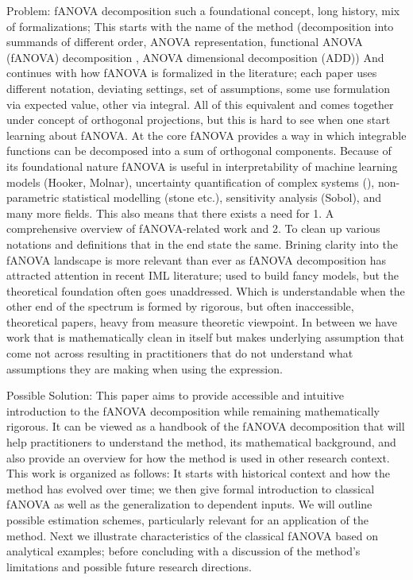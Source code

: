 
Problem: fANOVA decomposition such a foundational concept, long history, mix of formalizations;
This starts with the name of the method (decomposition into summands of different order, ANOVA representation, functional ANOVA (fANOVA) decomposition \cite{hooker2004}, ANOVA dimensional decomposition (ADD))
And continues with how fANOVA is formalized in the literature; each paper uses different notation, deviating settings, set of assumptions, some use formulation via expected value, other via integral.
All of this equivalent and comes together under concept of orthogonal projections, but this is hard to see when one start learning about fANOVA.
At the core fANOVA provides a way in which integrable functions can be decomposed into a sum of orthogonal components. Because of its foundational nature fANOVA is useful in interpretability of machine learning models (Hooker, Molnar), uncertainty quantification of complex systems (\cite{rahman2014}), non-parametric statistical modelling (stone etc.), sensitivity analysis (Sobol), and many more fields.
This also means that there exists a need for 1. A comprehensive overview of fANOVA-related work and 2. To clean up various notations and definitions that in the end state the same.
Brining clarity into the fANOVA landscape is more relevant than ever as fANOVA decomposition has attracted attention in recent IML literature; used to build fancy models, but the theoretical foundation often goes unaddressed.
Which is understandable when the other end of the spectrum is formed by rigorous, but often inaccessible, theoretical papers, heavy from measure theoretic viewpoint. In between we have work that is mathematically clean in itself but makes underlying assumption that come not across resulting in practitioners that do not understand what assumptions they are making when using the expression.

Possible Solution: This paper aims to provide accessible and intuitive introduction to the fANOVA decomposition while remaining mathematically rigorous.
It can be viewed as a handbook of the fANOVA decomposition that will help practitioners to understand the method, its mathematical background, and also provide an overview for how the method is used in other research context.
This work is organized as follows: It starts with historical context and how the method has evolved over time; we then give formal introduction to classical fANOVA as well as the generalization to dependent inputs. We will outline possible estimation schemes, particularly relevant for an application of the method. Next we illustrate characteristics of the classical fANOVA based on analytical examples; before concluding with a discussion of the method's limitations and possible future research directions.
